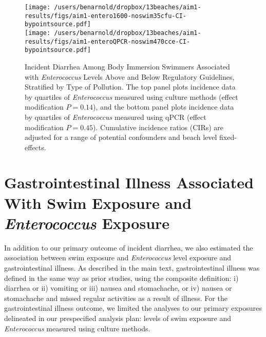 \documentclass[12pt]{article}\usepackage[]{graphicx}\usepackage[]{color}
\begin{document}
\begin{figure}
\begin{center}
\texttt{[image: /users/benarnold/dropbox/13beaches/aim1-results/figs/aim1-entero1600-noswim35cfu-CI-bypointsource.pdf]} \\
\texttt{[image: /users/benarnold/dropbox/13beaches/aim1-results/figs/aim1-enteroQPCR-noswim470cce-CI-bypointsource.pdf]}
\caption{Incident Diarrhea Among Body Immersion Swimmers Associated with \textit{Enterococcus} Levels Above and Below Regulatory Guidelines, Stratified by Type of Pollution. The top panel plots incidence data by quartiles of \textit{Enterococcus} measured using culture methods (effect modification $P=0.14$), and the bottom panel plots incidence data by quartiles of \textit{Enterococcus} measured using qPCR (effect modification $P=0.45$).  Cumulative incidence ratios (CIRs) are adjusted for a range of potential confounders and beach level fixed-effects. \label{fig:enteropol}}
\end{center}
\end{figure}



\clearpage
\section{Gastrointestinal Illness Associated With Swim Exposure and \textit{Enterococcus} Exposure}

In addition to our primary outcome of incident diarrhea, we also estimated the association between swim exposure and \textit{Enterococcus} level exposure and gastrointestinal illness. As described in the main text, gastrointestinal illness was defined in the same way as prior studies,\supercite{Wade2010-bb,Wade2010-ps,Colford2012-um,Arnold2013-xd,Yau2014-pl} using the composite definition: i) diarrhea or ii) vomiting or iii) nausea and stomachache, or iv) nausea or stomachache and missed regular activities as a result of illness.  For the gastrointestinal illness outcome, we limited the analyses to our primary exposures delineated in our prespecified analysis plan: levels of swim exposure and \textit{Enterococcus} measured using culture methods.
\end{document}
